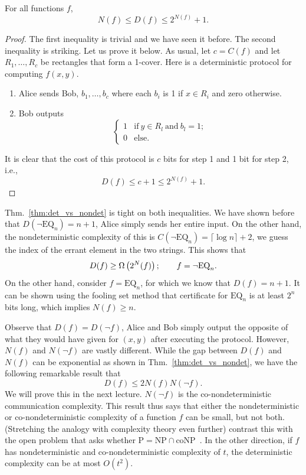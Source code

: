 \documentclass[usletter]{article}
\providecommand\rbrac[1]{\ensuremath \left(#1\right)}
\providecommand{\bigo}{O}
\newcommand{\df}{D(f)}
\newcommand{\dnf}{D(\neg f)}
\newcommand{\nf}{N(f)}
\newcommand{\nnf}{N(\neg f)}
\newcommand{\cf}{C(f)}
\newcommand{\EQ}{\mathrm{EQ}}
\newcommand{\nEQ}{\neg \mathrm{EQ}}
\renewcommand{\P}{\mathrm{P}}
\newcommand{\NP}{\mathrm{NP}}
\newcommand{\coNP}{\mathrm{coNP}}
\begin{document}
\begin{theorem}
\label{thm:det_vs_nondet}
For all functions $f$,
$$
\nf \leq \df \leq 2^{\nf} + 1.
$$
\end{theorem}
\begin{proof}
The first inequality is trivial and we have seen it before. The second inequality is striking. Let us prove it below. As usual, let $c = \cf$ and let $R_1, \ldots, R_c$ be rectangles that form a 1-cover. Here is a deterministic protocol for computing $f(x,y)$.
\begin{enumerate}
    \item Alice sends Bob, $b_1, \ldots, b_c$ where each $b_i$ is 1 if $x \in R_i$ and zero otherwise.
    \item Bob outputs
        $$
            \begin{cases}
            1 & \mathrm{if}\ y \in R_l\ \mathrm{and}\ b_l = 1;\\
            0 & \mathrm{else.}
            \end{cases}
         $$
\end{enumerate}
It is clear that the cost of this protocol is $c$ bits for step 1 and 1 bit for step 2, i.e.,
$$
\df \leq c+1 \leq 2^{\nf} + 1.
$$
\end{proof}

\begin{remark}
Thm.~\ref{thm:det_vs_nondet} is tight on both inequalities. We have shown before that $D(\nEQ_n) = n+1$, Alice simply sends her entire input. On the other hand, the nondeterministic complexity of this is $C(\nEQ_n) = \lceil \log n \rceil + 2$, we guess the index of the errant element in the two strings. This shows that
$$
D(f) \geq \Omega \rbrac{2^\nf}; \qquad f = \nEQ_n.
$$
On the other hand, consider $f = \EQ_n$, for which we know that $\df = n+1$. It can be shown using the fooling set method that certificate for $\EQ_n$ is at least $2^n$ bits long, which implies $\nf \geq n$.
\end{remark}

Observe that $\df = \dnf$, Alice and Bob simply output the opposite of what they would have given for $(x,y)$ after executing the protocol. However, $\nf$ and $\nnf$ are vastly different. While the gap between $\df$ and $\nf$ can be exponential as shown in Thm.~\ref{thm:det_vs_nondet}, we have the following remarkable result that
$$
\df \leq 2 \nf \nnf.
$$
We will prove this in the next lecture. $\nnf$ is the co-nondeterministic communication complexity. This result thus says that either the nondeterministic or co-nondeterministic complexity of a function $f$ can be small, but not both. (Stretching the analogy with complexity theory even further) contrast this with the open problem that asks whether $\P = \NP \cap \coNP$~\cite{papadimitriou1984communication}. In the other direction, if $f$ has nondeterministic and co-nondeterministic complexity of $t$, the deterministic complexity can be at most $\bigo(t^2)$.




\end{document}
